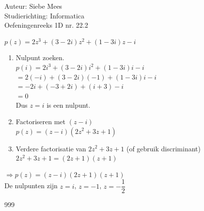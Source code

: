\documentclass[a4paper]{article}
\begin{document}
  
\noindent \large Auteur: Siebe Mees \\
\noindent \large Studierichting: Informatica\\
\noindent \large Oefeningenreeks 1D nr. 22.2\\

\medskip

\normalsize

$p(z)=2z^{3}+(3-2i)z^{2}+(1-3i)z-i$\\

\begin{enumerate}
\item Nulpunt zoeken.\\

$p(i)=2i^{3}+(3-2i)i^{2}+(1-3i)i-i $\\

$=2(-i)+(3-2i)(-1)+(1-3i)i-i $\\

$=-2i+(-3+2i)+(i+3)-i $\\

$=0 $\\

Dus $z=i$ is een nulpunt.\\

\item Factoriseren met $(z-i) $\\

$p(z)=(z-i)\left(2z^{2}+3z+1\right) $\\

\item Verdere factorisatie van $2z^{2}+3z+1 $ (of gebruik discriminant) \\

$2z^{2}+3z+1=(2z+1)(z+1) $\\
\end{enumerate}

$ \Rightarrow p(z)=(z-i)(2z+1)(z+1) $\\

De nulpunten zijn $z=i$, $z=-1$, $z=-\dfrac{1}{2} $\\


\begin{thebibliography}{999}

\end{thebibliography}
\end{document}
